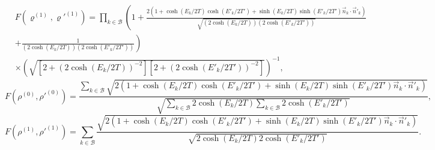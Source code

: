 	\begin{eqnarray}
	&F(\varrho^{(1)},\varrho'^{(1)})=\prod_{k\in\mathcal{B}} \left(1+\frac{2(1+\cosh(E_k/2T)\cosh(E'_k/2T')+\sinh(E_k/2T)\sinh(E'_k/2T')\vec{n}_k\cdot\vec{n}'_k)}{\sqrt{(2\cosh (E_k/2T))(2\cosh (E'_k/2T'))}} \right. \nonumber\\
	&\left.+\frac{1}{(2\cosh (E_k/2T))(2\cosh (E'_k/2T'))}\right)\nonumber\\
	&\times\left(\sqrt{[2+ (2\cosh (E_k/2T))^{-2}][2+(2\cosh (E'_k/2T'))^{-2}]}\right)^{-1},
\end{eqnarray}
\vspace{\baselineskip}
\begin{equation}
F(\rho^{(0)},\rho'^{(0)})=\frac{\sum_{k\in\mathcal{B}} \sqrt{2\left(1+\cosh(E_k/2T)\cosh(E'_k/2T')+\sinh(E_k/2T)\sinh(E'_k/2T')\vec{n}_k\cdot\vec{n}'_k\right)}}{\sqrt{\sum_{k\in\mathcal{B}} 2\cosh (E_k/2T)\sum_{k\in\mathcal{B}}2\cosh (E'_{k}/2T')}},
\end{equation}\vspace{\baselineskip}
\begin{equation}
F(\rho^{(1)},\rho'^{(1)})=\sum_{k\in\mathcal{B}} \frac{\sqrt{2\left(1+\cosh(E_k/2T)\cosh(E'_k/2T')+\sinh(E_k/2T)\sinh(E'_k/2T')\vec{n}_k\cdot\vec{n}'_k\right)}}{\sqrt{ 2\cosh (E_k/2T)2\cosh (E'_k/2T')}}.
\end{equation}

